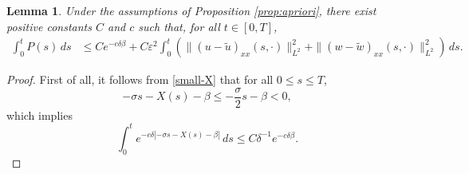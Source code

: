 \documentclass[11pt,reqno]{amsart}
\newtheorem{lemma}{Lemma}[section]
\numberwithin{equation}{section} %
\begin{document}
\begin{lemma}\label{lem:bd}
Under the assumptions of Proposition \ref{prop:apriori}, there exist positive constants $C$ and $c$ such that, for all $t \in [0,T]$,
\begin{align*}
    \int_0^t P(s) \,ds &\leq C e^{-c\delta \beta} + C\varepsilon^2 \int_0^t \left( \|(u-\tilde{u})_{xx}(s,\cdot)\|_{L^2}^2 + \|(w-\tilde{w})_{xx}(s,\cdot)\|_{L^2}^2 \right) \,ds.
\end{align*}
\end{lemma}

\begin{proof}
First of all, it follows from \eqref{small-X} that for all $0\le s \leq T$, 
\[-\sigma s - X(s) - \beta \leq -\frac{\sigma}{2}s - \beta < 0,\]  
which implies
\begin{equation}\label{eq:exp_decay}
    \int_0^t e^{-c\delta|-\sigma s - X(s) - \beta|} \, ds \le C\delta^{-1}e^{-c\delta\beta}.
\end{equation}



\end{proof}
\end{document}
